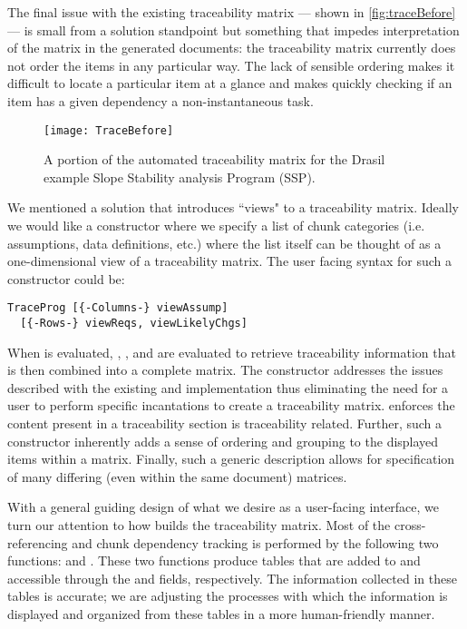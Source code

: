 The final issue with the existing traceability matrix --- shown in \autoref{fig:traceBefore} --- is small from a solution standpoint but something that impedes interpretation of the matrix in the generated documents: the traceability matrix currently does not order the items in any particular way. The lack of sensible ordering makes it difficult to locate a particular item at a glance and makes quickly checking if an item has a given dependency a non-instantaneous task.

\begin{figure}[H]
\texttt{[image: TraceBefore]}
\caption{A portion of the automated traceability matrix for the Drasil example Slope Stability analysis Program (SSP).}\label{fig:traceBefore}
\end{figure}


We mentioned a solution that introduces ``views" to a traceability matrix. Ideally we would like a constructor where we specify a list of chunk categories (i.e. assumptions, data definitions, etc.) where the list itself can be thought of as a one-dimensional view of a traceability matrix. The user facing syntax for such a constructor could be:

\begin{tcolorbox}
\begin{verbatim}
TraceProg [{-Columns-} viewAssump]
  [{-Rows-} viewReqs, viewLikelyChgs]
\end{verbatim}
\end{tcolorbox}

When  is evaluated, , , and  are evaluated to retrieve traceability information that is then combined into a complete matrix. The constructor  addresses the issues described with the existing  and  implementation thus eliminating the need for a user to perform specific incantations to create a traceability matrix.  enforces the content present in a traceability section is traceability related. Further, such a constructor inherently adds a sense of ordering and grouping to the displayed items within a matrix. Finally, such a generic  description allows for specification of many differing (even within the same document) matrices.

With a general guiding design of what we desire as a user-facing interface, we turn our attention to how  builds the traceability matrix. Most of the cross-referencing and chunk dependency tracking is performed by the following two functions:  and . These two functions produce tables that are added to  and accessible through the  and  fields, respectively. The information collected in these tables is accurate; we are adjusting the processes with which the information is displayed and organized from these tables in a more human-friendly manner.

